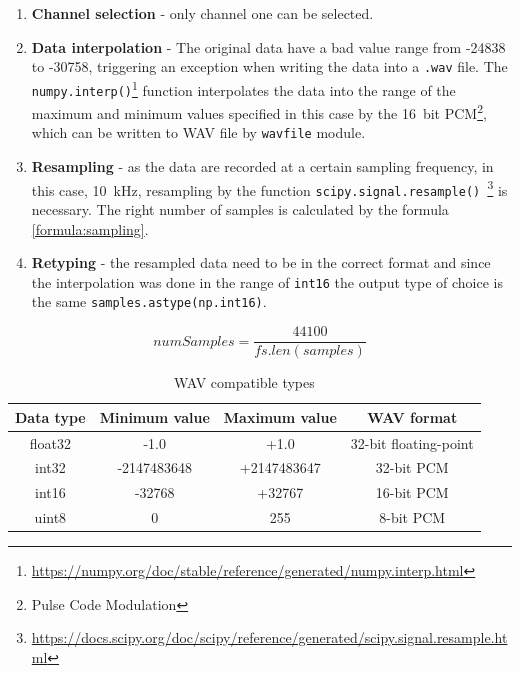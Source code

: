 \begin{enumerate}
    \item \textbf{Channel selection} - only channel one can be selected.
    \item \textbf{Data interpolation} - The original data have a bad value range from -24838 to -30758, triggering an exception when writing the data into a \verb|.wav| file. The \verb|numpy.interp()|\footnote{\url{https://numpy.org/doc/stable/reference/generated/numpy.interp.html}} function interpolates the data into the range of the maximum and minimum values specified in this case by the \qty{16}{bit} PCM\footnote{Pulse Code Modulation}, which can be written to WAV file by \verb|wavfile| module.
    \item \textbf{Resampling} - as the data are recorded at a certain sampling frequency, in this case, \qty{10}{\kHz}, resampling by the function \verb|scipy.signal.resample() |\footnote{\url{https://docs.scipy.org/doc/scipy/reference/generated/scipy.signal.resample.html}} is necessary. The right number of samples is calculated by the formula \ref{formula:sampling}.
    \item \textbf{Retyping} - the resampled data need to be in the correct format and since the interpolation was done in the range of \verb|int16| the output type of choice is the same \verb|samples.astype(np.int16)|.
\end{enumerate}

\begin{equation}
    \label{formula:sampling}
    numSamples = \frac{44100}{fs.len(samples)}
\end{equation}


\begin{table}[]
    \centering
    \begin{tabular}{|c|c|c|c|}
    \hline
    \textbf{Data type} & \textbf{Minimum value} & \textbf{Maximum value} & \textbf{WAV format} \\
    \hline
    float32 & -1.0 & +1.0 & 32-bit floating-point \\ \hline
    int32 & -2147483648 & +2147483647 & 32-bit PCM \\ \hline
    int16 & -32768 & +32767 & 16-bit PCM \\ \hline
    uint8 & 0 & 255 & 8-bit PCM \\
    \hline
    \end{tabular}
    \caption{WAV compatible types}
    \label{tab:my_label}
\end{table}




